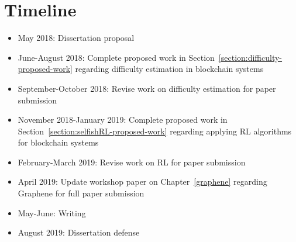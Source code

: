 \chapter{Timeline}
\label{timeline}

\begin{itemize}
\item May 2018: Dissertation proposal
\item June-August 2018: Complete proposed work in Section~\ref{section:difficulty-proposed-work} regarding difficulty estimation in blockchain systems
\item September-October 2018: Revise work on difficulty estimation for paper submission
\item November 2018-January 2019:  Complete proposed work in Section~\ref{section:selfishRL-proposed-work} regarding applying RL algorithms for blockchain systems
\item February-March 2019: Revise work on RL for paper submission
\item April 2019: Update workshop paper on Chapter~\ref{graphene} regarding Graphene for full paper submission
\item May-June: Writing 
\item August 2019: Dissertation defense
\end{itemize}